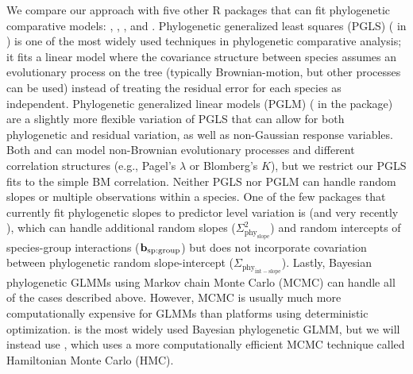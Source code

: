 \documentclass[12pt]{article}
\begin{document}
We compare our approach with five other R packages that can fit phylogenetic comparative models:  \citep{pinheiro2014r},  \citep{ho2014phylolm},  \citep{pearse2015pez},  \citep{phyr} and  \citep{burkner2018brms}.
Phylogenetic generalized least squares (PGLS) ( in ) is one of the most widely used techniques in phylogenetic comparative analysis; it fits a linear model where the covariance structure between species assumes an evolutionary process on the tree (typically Brownian-motion, but other processes can be used) instead of treating the residual error for each species as independent.
Phylogenetic generalized linear models (PGLM) ( in the  package) are a slightly more flexible variation of PGLS that can allow for both phylogenetic and residual variation, as well as non-Gaussian response variables.
Both  and  can model non-Brownian evolutionary processes and different correlation structures (e.g., Pagel's $\lambda$ or Blomberg's $K$), but we restrict our PGLS fits to the simple BM correlation. 
Neither PGLS nor PGLM can handle random slopes or multiple observations within a species.
One of the few packages that currently fit phylogenetic slopes to predictor level variation is  (and very recently ), which can handle additional random slopes ($\Sigma^2_{\mathrm{phy_{slope}}}$) and random intercepts of species-group interactions ($\bf{b_{\mathrm{sp:group}}}$) but does not incorporate covariation between phylogenetic random slope-intercept ($\Sigma_{\mathrm{phy_{int-slope}}}$).
Lastly, Bayesian phylogenetic GLMMs using Markov chain Monte Carlo (MCMC) can handle all of the cases described above. 
However, MCMC is usually much more computationally expensive for GLMMs than platforms using deterministic optimization.
 \citep{hadfield2010general} is the most widely used Bayesian phylogenetic GLMM, but we will instead use , which uses a more computationally efficient MCMC technique called Hamiltonian Monte Carlo (HMC)\citep{duane1987hybrid}.
 
\end{document}
